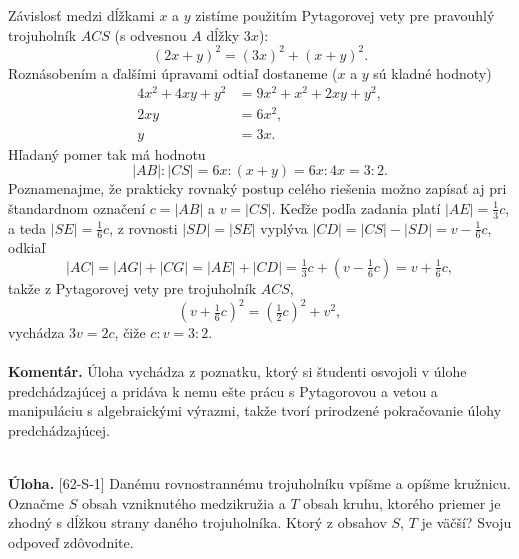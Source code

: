 \documentclass[11pt,a4paper,oneside,final]{book}
\newcommand{\kom}{\textbf{Komentár.} }
\newcommand{\ul}{\textbf{Úloha.} }
\begin{document}
Závislosť medzi dĺžkami $x$ a $y$ zistíme použitím Pytagorovej vety pre pravouhlý trojuholník $ACS$ (s odvesnou $A$ dĺžky $3x$):
$$(2x + y)^2= (3x)^2+ (x + y)^2.$$
Roznásobením a ďalšími úpravami odtiaľ dostaneme ($x$ a $y$ sú kladné hodnoty)
\begin{align*}
4x^2+ 4xy + y^2 &= 9x^2+ x^2+ 2xy + y^2,\\
2xy & = 6x^2,\\
y &= 3x.
\end{align*}
Hľadaný pomer tak má hodnotu
$$|AB| : |CS| = 6x : (x + y) = 6x : 4x = 3 : 2.$$
Poznamenajme, že prakticky rovnaký postup celého riešenia možno zapísať aj pri štandardnom označení $c = |AB|$ a $v = |CS|$. Keďže podľa zadania platí $|AE| =\frac{1}{3}c$, a teda $|SE| =\frac{1}{6}c$, z rovnosti $|SD| = |SE|$ vyplýva $|CD| = |CS|-|SD| = v-\frac{1}{6}c$, odkiaľ
$$|AC| = |AG| + |CG| = |AE| + |CD| =\tfrac{1}{3}c + (v-\tfrac{1}{6}c) = v +\tfrac{1}{6}c,$$
takže z Pytagorovej vety pre trojuholník $ACS$,
$$(v +\tfrac{1}{6}c)^2= (\tfrac{1}{2}c)^2+ v^2,$$
vychádza $3v = 2c$, čiže $c : v = 3 : 2$.\\
\\
\kom Úloha vychádza z poznatku, ktorý si študenti osvojoli v úlohe predchádzajúcej a pridáva k nemu ešte prácu s Pytagorovou a vetou a manipuláciu s algebraickými výrazmi, takže tvorí prirodzené pokračovanie úlohy predchádzajúcej.\\
\\
\begin{tcolorbox}[breakable,notitle,boxrule=0pt,colback=light-gray,colframe=light-gray]\ul [62-S-1] Danému rovnostrannému trojuholníku vpíšme a opíšme kružnicu. Označme $S$ obsah vzniknutého medzikružia a $T$ obsah kruhu, ktorého priemer je zhodný s dĺžkou strany daného trojuholníka. Ktorý z obsahov $S$, $T$ je väčší? Svoju odpoveď zdôvodnite.

\end{tcolorbox}
\end{document}
